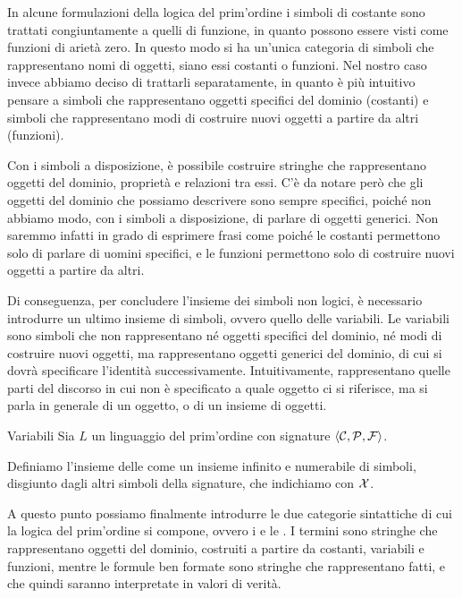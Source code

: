 In alcune formulazioni della logica del prim'ordine i simboli di costante sono trattati congiuntamente a quelli di funzione, in quanto possono essere visti come funzioni di arietà zero. In questo modo si ha un'unica categoria di simboli che rappresentano nomi di oggetti, siano essi costanti o funzioni. Nel nostro caso invece abbiamo deciso di trattarli separatamente, in quanto è più intuitivo pensare a simboli che rappresentano oggetti specifici del dominio (costanti) e simboli che rappresentano modi di costruire nuovi oggetti a partire da altri (funzioni).

Con i simboli a disposizione, è possibile costruire stringhe che rappresentano oggetti del dominio, proprietà e relazioni tra essi. C'è da notare però che gli oggetti del dominio che possiamo descrivere sono sempre specifici, poiché non abbiamo modo, con i simboli a disposizione, di parlare di oggetti generici. Non saremmo infatti in grado di esprimere frasi come  poiché le costanti permettono solo di parlare di uomini specifici, e le funzioni permettono solo di costruire nuovi oggetti a partire da altri.

Di conseguenza, per concludere l'insieme dei simboli non logici, è necessario introdurre un ultimo insieme di simboli, ovvero quello delle variabili. Le variabili sono simboli che non rappresentano né oggetti specifici del dominio, né modi di costruire nuovi oggetti, ma rappresentano oggetti generici del dominio, di cui si dovrà specificare l'identità successivamente. Intuitivamente, rappresentano quelle parti del discorso in cui non è specificato a quale oggetto ci si riferisce, ma si parla in generale di un oggetto, o di un insieme di oggetti.

\begin{definition}{Variabili}
  Sia \(L\) un linguaggio del prim'ordine con signature \(\langle \mathcal{C}, \mathcal{P}, \mathcal{F} \rangle\). 
  
  Definiamo l'insieme delle  come un insieme infinito e numerabile di simboli, disgiunto dagli altri simboli della signature, che indichiamo con \(\mathcal{X}\).
\end{definition}

A questo punto possiamo finalmente introdurre le due categorie sintattiche di cui la logica del prim'ordine si compone, ovvero i  e le . I termini sono stringhe che rappresentano oggetti del dominio, costruiti a partire da costanti, variabili e funzioni, mentre le formule ben formate sono stringhe che rappresentano fatti, e che quindi saranno interpretate in valori di verità.

